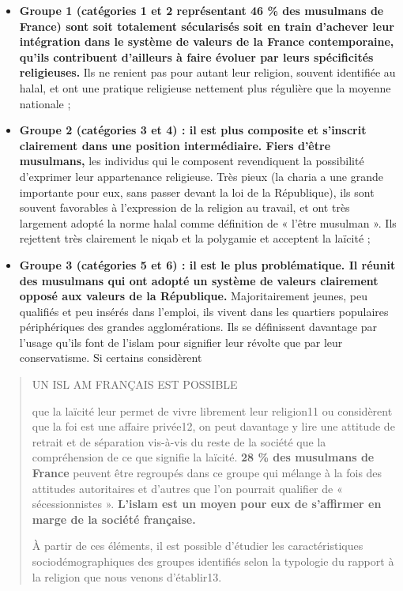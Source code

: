 \begin{itemize}
\item
  \textbf{Groupe 1 (catégories 1 et 2 représentant 46 \% des musulmans
  de France) sont soit totalement sécularisés soit en train d'achever
  leur intégration dans le système de valeurs de la France
  contemporaine, qu'ils contribuent d'ailleurs à faire évoluer par leurs
  spécificités religieuses.} Ils ne renient pas pour autant leur
  religion, souvent identifiée au halal, et ont une pratique religieuse
  nettement plus régulière que la moyenne nationale ;
\item
  \textbf{Groupe 2 (catégories 3 et 4) : il est plus composite et
  s'inscrit clairement dans une position intermédiaire. Fiers d'être
  musulmans,} les individus qui le composent revendiquent la possibilité
  d'exprimer leur appartenance religieuse. Très pieux (la charia a une
  grande importante pour eux, sans passer devant la loi de la
  République), ils sont souvent favorables à l'expression de la religion
  au travail, et ont très largement adopté la norme halal comme
  définition de « l'être musulman ». Ils rejettent très clairement le
  niqab et la polygamie et acceptent la laïcité ;
\item
  \textbf{Groupe 3 (catégories 5 et 6) : il est le plus problématique.
  Il réunit des musulmans qui ont adopté un système de valeurs
  clairement opposé aux valeurs de la République.} Majoritairement
  jeunes, peu qualifiés et peu insérés dans l'emploi, ils vivent dans
  les quartiers populaires périphériques des grandes agglomérations. Ils
  se définissent davantage par l'usage qu'ils font de l'islam pour
  signifier leur révolte que par leur conservatisme. Si certains
  considèrent
\end{itemize}

\begin{quote}
UN ISL AM FRANÇAIS EST POSSIBLE

que la laïcité leur permet de vivre librement leur religion11 ou
considèrent que la foi est une affaire privée12, on peut davantage y
lire une attitude de retrait et de séparation vis-à-vis du reste de la
société que la compréhension de ce que signifie la laïcité. \textbf{28
\% des musulmans de France} peuvent être regroupés dans ce groupe qui
mélange à la fois des attitudes autoritaires et d'autres que l'on
pourrait qualifier de « sécessionnistes ». \textbf{L'islam est un moyen
pour eux de s'affirmer en marge de la société française.}

À partir de ces éléments, il est possible d'étudier les caractéristiques
sociodémographiques des groupes identifiés selon la typologie du rapport
à la religion que nous venons d'établir13.
\end{quote}

